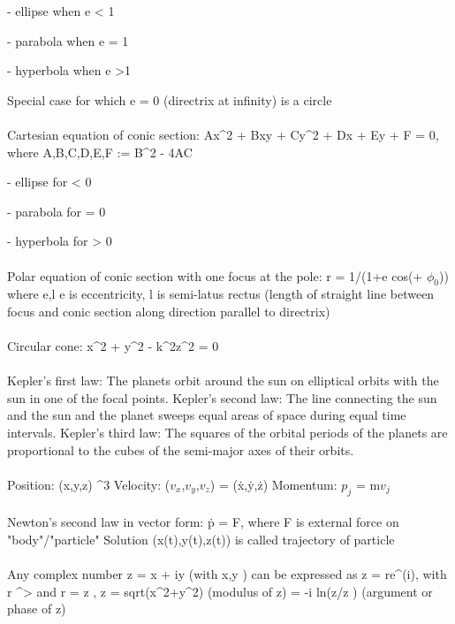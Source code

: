 \documentclass{article}
\begin{document}
- ellipse when \math e < 1\)

- parabola when \math e = 1\)

- hyperbola when \math e >1\)

Special case for which \math e = 0\) (directrix at infinity) is a circle
\\
\\
Cartesian equation of conic section: \math Ax^2 + Bxy + Cy^2 + Dx + Ey + F = 0\), where A,B,C,D,E,F \in \Re  \triangle := B^2 - 4AC\)

- ellipse for \triangle < 0\)

- parabola for \triangle = 0\)

- hyperbola for \triangle > 0\)
\\
\\
Polar equation of conic section with one focus at the pole: \math r = 1/(1+e cos(\phi + $\phi_0$))\) where \math e,l \in \Re e\) is eccentricity, \math l\) is semi-latus rectus (length of straight line between focus and conic section along direction parallel to directrix)
\\
\\
Circular cone: \math x^2 + y^2 - k^2z^2 = 0\)
\\
\\
Kepler's first law: The planets orbit around the sun on elliptical orbits with the sun in one of the focal points.
\newline Kepler's second law: The line connecting the sun and the sun and the planet sweeps equal areas of space during equal time intervals.
\newline Kepler's third law: The squares of the orbital periods of the planets are proportional to the cubes of the semi-major axes of their orbits.
\\
\\
Position: \math (x,y,z) \in \Re^3\)
\newline Velocity: \math ($v_x$,$v_y$,$v_z$) = (\.{x},\.{y},\.{z})\)
\newline Momentum: \math $p_j$ = m$v_j$
\\
\\
Newton's second law in vector form: \.{p} = F\), where F is external force on "body"/"particle"
\newline Solution \math (x(t),y(t),z(t))\) is called trajectory of particle
\\
\\
Any complex number \math z = x + iy\) (with \math x,y \in \Re\)) can be expressed as \math z = re^(i\theta)\), with \math r \in \Re^>\) and \phi \in \Re
\newline r = \vert z \vert, \vert z \vert = sqrt(x^2+y^2) (modulus of z)
\newline \phi = -i ln(z/\vert z \vert)\) (argument or phase of z)
\end{document}
